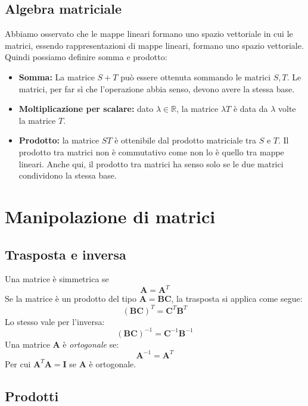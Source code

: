 \documentclass{article}
\begin{document}
        \subsection{Algebra matriciale}
            Abbiamo osservato che le mappe lineari formano uno spazio vettoriale in cui le matrici, essendo rappresentazioni di mappe 
            lineari, formano uno spazio vettoriale. Quindi possiamo definire somma e prodotto:
            \begin{itemize}
                \item \textbf{Somma:} La matrice $S+T$ può essere ottenuta sommando le matrici $S,T$. Le matrici, per far sì che 
                    l'operazione abbia senso, devono avere la stessa base.
                \item \textbf{Moltiplicazione per scalare:} dato $\lambda \in \mathbb{R}$, la matrice $\lambda T$ è data da 
                    $\lambda$ volte la matrice $T$.
                \item \textbf{Prodotto:} la matrice $ST$ è ottenibile dal prodotto matriciale tra $S$ e $T$. Il prodotto tra matrici non è 
                    commutativo come non lo è quello tra mappe lineari. Anche qui, il prodotto tra matrici ha senso solo se le due matrici 
                    condividono la stessa base.
            \end{itemize}
    \section{Manipolazione di matrici}
        \subsection{Trasposta e inversa}
            Una matrice è simmetrica se 
                \[\mathbf{A}=\mathbf{A}^T\] 
            Se la matrice è un prodotto del tipo $\mathbf{A} = \mathbf{BC}$, la trasposta si applica come segue:
                \[(\mathbf{BC})^T = \mathbf{C}^T\mathbf{B}^T\]
            Lo stesso vale per l'inversa:
                \[(\mathbf{BC})^{-1} = \mathbf{C}^{-1}\mathbf{B}^{-1}\]
            Una matrice $\mathbf{A}$ è \emph{ortogonale} se:
                \[\mathbf{A}^{-1} = \mathbf{A}^T\]
            Per cui $\mathbf{A}^T\mathbf{A} = \mathbf{I}$ se $\mathbf{A}$ è ortogonale.
        \subsection{Prodotti}
\end{document}
